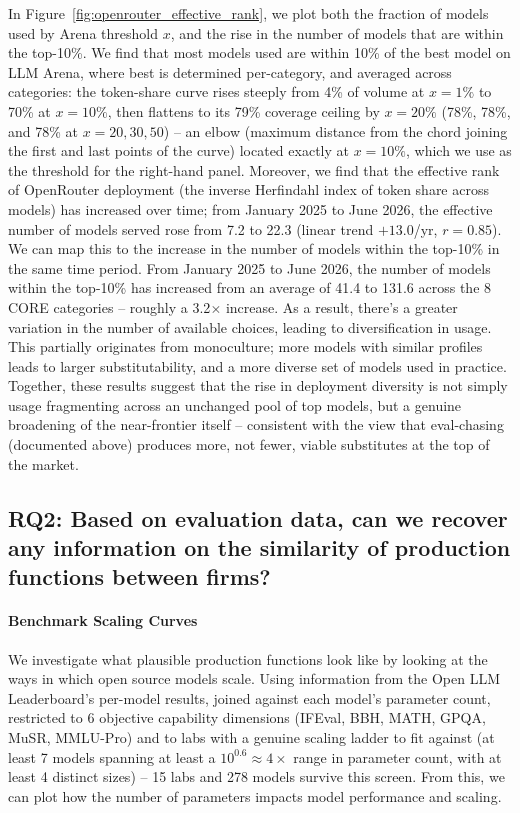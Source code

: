 In Figure~\ref{fig:openrouter_effective_rank}, we plot both the fraction of models used by Arena threshold $x$, and the rise in the number of models that are within the top-10\%.
We find that most models used are within 10\% of the best model on LLM Arena, where best is determined per-category, and averaged across categories: the token-share curve rises steeply from 4\% of volume at $x=1\%$ to 70\% at $x=10\%$, then flattens to its 79\% coverage ceiling by $x=20\%$ (78\%, 78\%, and 78\% at $x=20,30,50$) -- an elbow (maximum distance from the chord joining the first and last points of the curve) located exactly at $x=10\%$, which we use as the threshold for the right-hand panel. Moreover, we find that the effective rank of OpenRouter deployment (the inverse Herfindahl index of token share across models) has increased over time; from January 2025 to June 2026, the effective number of models served rose from 7.2 to 22.3 (linear trend $+13.0$/yr, $r=0.85$).
We can map this to the increase in the number of models within the top-10\% in the same time period.
From January 2025 to June 2026, the number of models within the top-10\% has increased from an average of 41.4 to 131.6 across the 8 CORE categories -- roughly a 3.2$\times$ increase.
As a result, there's a greater variation in the number of available choices, leading to diversification in usage.
This partially originates from monoculture; more models with similar profiles leads to larger substitutability, and a more diverse set of models used in practice.
Together, these results suggest that the rise in deployment diversity is not simply usage fragmenting across an unchanged pool of top models, but a genuine broadening of the near-frontier itself -- consistent with the view that eval-chasing (documented above) produces more, not fewer, viable substitutes at the top of the market.

\subsection{RQ2: Based on evaluation data, can we recover any information on the similarity of production functions between firms? }
\paragraph{Benchmark Scaling Curves}
We investigate what plausible production functions look like by looking at the ways in which open source models scale.
Using information from the Open LLM Leaderboard's per-model results, joined against each model's parameter count, restricted to 6 objective capability dimensions (IFEval, BBH, MATH, GPQA, MuSR, MMLU-Pro) and to labs with a genuine scaling ladder to fit against (at least 7 models spanning at least a $10^{0.6}\approx4\times$ range in parameter count, with at least 4 distinct sizes) -- 15 labs and 278 models survive this screen.
From this, we can plot how the number of parameters impacts model performance and scaling.

